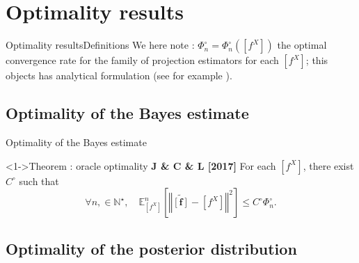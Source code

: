 \documentclass[10pt]{beamer}
\begin{document}
\section{Optimality results}
\begin{frame}{Optimality results}{Definitions}
We here note :
$\Phi_{n}^{\circ} = \Phi_{n}^{\circ}\left(\left[f^{X}\right]\right)$ the optimal convergence rate for the family of projection estimators for each $\left[f^{X}\right]$; this objects has analytical formulation (see for example \citet{FCMLT}).
\end{frame}


\subsection{Optimality of the Bayes estimate}
\begin{frame}{Optimality of the Bayes estimate}
\begin{block}<1->{Theorem : oracle optimality \textbf{J \& C \& L [2017]}}
For each $\left[f^{X}\right]$, there exist $C^{\circ}$ such that
	\[\forall n, \in \mathbb{N}^{\star}, \quad \mathbb{E}_{\left[f^{X}\right]}^{n}\left[\left\Vert \widetilde{\left[\boldsymbol{f}\right]} - \left[f^{X}\right] \right\Vert^{2}\right] \leq C^{\circ} \Phi_{n}^{\circ}.\]
\end{block}

\end{frame}

\subsection{Optimality of the posterior distribution}
\end{document}
